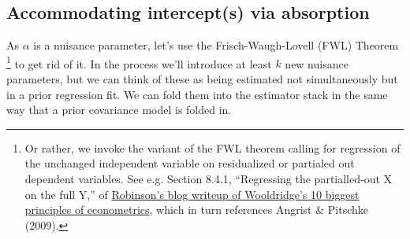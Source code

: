 \documentclass{article}
\begin{document}
\subsection{Accommodating intercept(s) via absorption}\label{sec:accomm-interc-via}
As $\alpha$ is a nuisance parameter, let's use the
Frisch-Waugh-Lovell (FWL) Theorem%
\footnote{Or rather, we invoke the variant of the FWL theorem calling
  for regression of the unchanged independent variable on residualized
or partialed out dependent variables.  See e.g. Section 8.4.1,
``Regressing the partialled-out X on the full Y,'' of
\href{https://bookdown.org/ts_robinson1994/10_fundamental_theorems_for_econometrics/frisch.html}{Robinson's
  blog writeup of Wooldridge's 10 biggest principles of econometrics},
which in turn references Angrist \& Pitschke (2009).} to get rid of it.  In the process we'll
introduce at least $k$ new nuisance parameters, but we can think of these as
being estimated not simultaneously but in a prior regression fit.
We can fold them into the estimator stack in the same way that a prior
covariance model is folded in.
\end{document}
